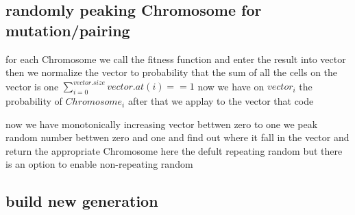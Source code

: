 \documentclass[11pt,fullpage]{article}
\begin{document}
\subsection{randomly peaking Chromosome for mutation/pairing  }
for each Chromosome we call the fitness function and enter the result into vector then we normalize the vector to probability  that the sum of all the cells on the vector is one $\sum\limits_{i=0}^{vector.size} vector.at(i) ==1$ now we have on $vector_i$ the probability of $Chromosome_i$ after that we applay to the vector that code

 now we have monotonically increasing  vector bettwen zero to one we peak random number bettwen zero and one and find out where it fall in the vector and return the appropriate Chromosome\newline
here the defult  repeating random but there is an option to enable non-repeating random
 
  \subsection{ build new generation}
 

 

\end{document}
